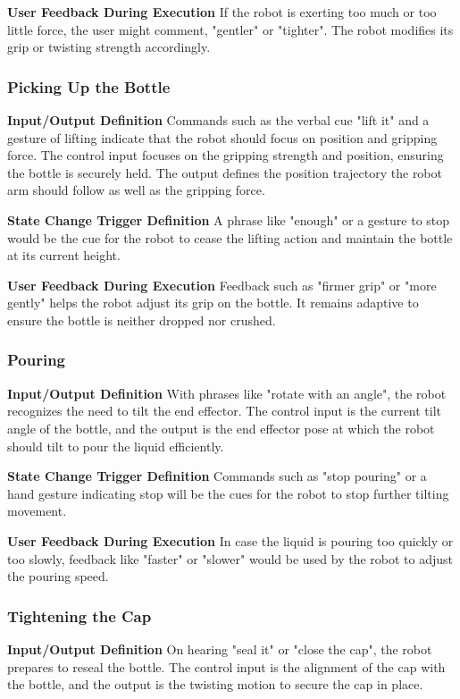\documentclass[conference]{IEEEtran}
\begin{document}
\textbf{User Feedback During Execution}
If the robot is exerting too much or too little force, the user might comment, "gentler" or "tighter". The robot modifies its grip or twisting strength accordingly.

\subsubsection{Picking Up the Bottle}
\textbf{Input/Output Definition}
Commands such as the verbal cue "lift it" and a gesture of lifting indicate that the robot should focus on position and gripping force. The control input focuses on the gripping strength and position, ensuring the bottle is securely held. The output defines the position trajectory the robot arm should follow as well as the gripping force.

\textbf{State Change Trigger Definition}
A phrase like "enough" or a gesture to stop would be the cue for the robot to cease the lifting action and maintain the bottle at its current height.

\textbf{User Feedback During Execution}
Feedback such as "firmer grip" or "more gently" helps the robot adjust its grip on the bottle. It remains adaptive to ensure the bottle is neither dropped nor crushed. 

\subsubsection{Pouring}
\textbf{Input/Output Definition}
With phrases like "rotate with an angle", the robot recognizes the need to tilt the end effector. The control input is the current tilt angle of the bottle, and the output is the end effector pose at which the robot should tilt to pour the liquid efficiently.

\textbf{State Change Trigger Definition}
Commands such as "stop pouring" or a hand gesture indicating stop will be the cues for the robot to stop further tilting movement. 

\textbf{User Feedback During Execution}
In case the liquid is pouring too quickly or too slowly, feedback like "faster" or "slower" would be used by the robot to adjust the pouring speed.

\subsubsection{Tightening the Cap}
\textbf{Input/Output Definition}
On hearing "seal it" or "close the cap", the robot prepares to reseal the bottle. The control input is the alignment of the cap with the bottle, and the output is the twisting motion to secure the cap in place.
\end{document}
